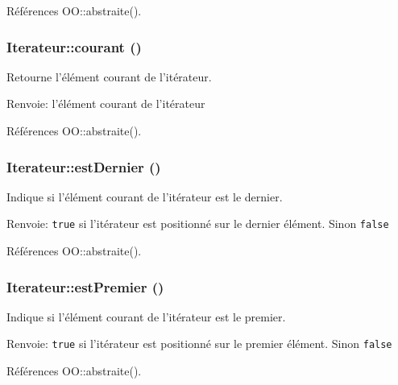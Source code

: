 Références OO::abstraite().
\subsubsection{\setlength{\rightskip}{0pt plus 5cm}Iterateur::courant ()}\label{class_iterateur_525e78b4e7c5aec4cc4e8003ca9e730b}


Retourne l'élément courant de l'itérateur. 

\begin{Desc}
\item[Renvoie:]l'élément courant de l'itérateur \end{Desc}


Références OO::abstraite().
\subsubsection{\setlength{\rightskip}{0pt plus 5cm}Iterateur::estDernier ()}\label{class_iterateur_b90977faf081ea8db8e56415e0bc9e2f}


Indique si l'élément courant de l'itérateur est le dernier. 

\begin{Desc}
\item[Renvoie:]{\tt true} si l'itérateur est positionné sur le dernier élément. Sinon {\tt false} \end{Desc}


Références OO::abstraite().
\subsubsection{\setlength{\rightskip}{0pt plus 5cm}Iterateur::estPremier ()}\label{class_iterateur_6e49a71af6b96a13d20aa137ddd9ac2d}


Indique si l'élément courant de l'itérateur est le premier. 

\begin{Desc}
\item[Renvoie:]{\tt true} si l'itérateur est positionné sur le premier élément. Sinon {\tt false} \end{Desc}


Références OO::abstraite().
